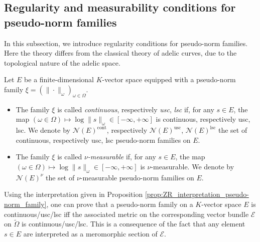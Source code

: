 \documentclass [11pt,reqno]{amsart}
\newcommand{\1}{\mathmybb{1}}
\def\cE{{\mathcal{E}}}
\def\cN{{\mathcal{N}}}
\def\cont{\operatorname{cont}}
\def\lsc{\operatorname{lsc}}
\def\usc{\operatorname{usc}}
\def\tilde{\widetilde}
\begin{document}
\subsection{Regularity and measurability conditions for pseudo-norm families}
\label{sub:regularity_measurability_smie-norm_families}

In this subsection, we introduce regularity conditions for pseudo-norm families. Here the theory differs from the classical theory of adelic curves, due to the topological nature of the adelic space. 

\begin{definition}
\label{def:continuous_measurable_semi-norm_family}
Let $E$ be a finite-dimensional $K$-vector space equipped with a pseudo-norm family $\xi =(\|\cdot\|_\omega)_{\omega\in \Omega}$. %
\begin{itemize}
	\item[(1)] The family $\xi$ is called \emph{continuous}, respectively \emph{usc}, \emph{lsc}  if, for any $s\in E$, the map $(\omega\in \Omega)\mapsto \log\|s\|_{\omega} \in [-\infty,+\infty]$ is continuous, respectively usc, lsc. We denote by $\cN(E)^{\cont}$, respectively $\cN(E)^{\usc}$, $\cN(E)^{\lsc}$ the set of continuous, respectively usc, lsc pseudo-norm families on $E$.
	\item[(2)] The family $\xi$ is called $\nu$\emph{-measurable} if, for any $s\in E$, the map $(\omega\in \Omega)\mapsto \log\|s\|_{\omega} \in [-\infty,+\infty]$ is $\nu$-measurable. We denote by $\cN(E)^{\nu}$ the set of $\nu$-measurable pseudo-norm families on $E$.
\end{itemize}
\end{definition}

\begin{remark}
\label{rem:ZR_interpretation_regular_pseudo-norm_families}
Using the interpretation given in Proposition \ref{prop:ZR_interpretation_pseudo-norm_family}, one can prove that a pseudo-norm family on a $K$-vector space $E$ is continuous/usc/lsc iff the associated metric on the corresponding vector bundle $\cE$ on $\tilde{\Omega}$ is continuous/usc/lsc. This is a consequence of the fact that any element $s\in E$ are interpreted as a meromorphic section of $\cE$.
\end{remark}
\end{document}
